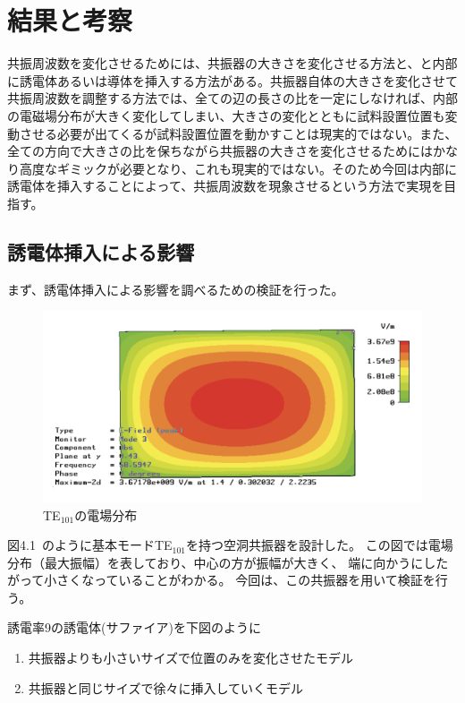 \chapter{結果と考察}
共振周波数を変化させるためには、共振器の大きさを変化させる方法と、と内部に誘電体あるいは導体を挿入する方法がある。共振器自体の大きさを変化させて共振周波数を調整する方法では、全ての辺の長さの比を一定にしなければ、内部の電磁場分布が大きく変化してしまい、大きさの変化とともに試料設置位置も変動させる必要が出てくるが試料設置位置を動かすことは現実的ではない。また、全ての方向で大きさの比を保ちながら共振器の大きさを変化させるためにはかなり高度なギミックが必要となり、これも現実的ではない。そのため今回は内部に誘電体を挿入することによって、共振周波数を現象させるという方法で実現を目指す。


\section{誘電体挿入による影響}
まず、誘電体挿入による影響を調べるための検証を行った。

\vspace{10 mm}

\begin{figure}[h]
  \begin{center}
    \includegraphics[width=12cm]{./image/te101.png}
    \caption{TE$_{101}$の電場分布}
    \label{fig:E-TE101}
  \end{center}
\end{figure}

図4.1 のように基本モードTE$_{101}$を持つ空洞共振器を設計した。
この図では電場分布（最大振幅）を表しており、中心の方が振幅が大きく、
端に向かうにしたがって小さくなっていることがわかる。
今回は、この共振器を用いて検証を行う。

誘電率9の誘電体(サファイア)を下図のように

\begin{enumerate}
  \item 共振器よりも小さいサイズで位置のみを変化させたモデル
  \item 共振器と同じサイズで徐々に挿入していくモデル
\end{enumerate}

